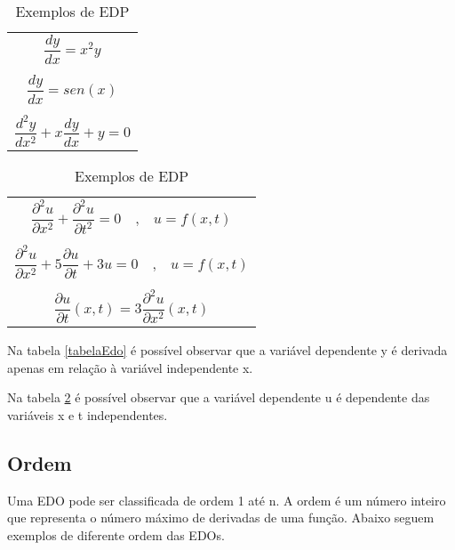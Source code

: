 \begin{table}[h!]
\parbox{.40\linewidth}{
\centering
\begin{tabular}{c}
\hline 
  $
\dfrac{dy}{dx} = x^2y
$
  \\  \\
  
$
\dfrac{dy}{dx} = sen(x)
$

 \\ \\
  
$
\dfrac{d^2y}{dx^2} + x \dfrac{dy}{dx} + y = 0
$  \\

\hline
\end{tabular}
\caption{Exemplos de EDO}
\label{tabelaEdo}
}
\hfill
\parbox{.50\linewidth}{
\centering
\begin{tabular}{c}
\toprule

$
\dfrac{\partial ^2u}{\partial x^2} + \dfrac{\partial ^2u}{\partial t^2} = 0  \quad \textrm{,} \quad  u = f(x,t)
$

 \\ \\
$
\dfrac{\partial^2u}{\partial x^2} + 5 \dfrac{\partial u}{\partial t} + 3u = 0 \quad \textrm{,} \quad   u = f(x,t)
$

 \\ \\ 
 $ \dfrac{\partial u}{\partial t}(x,t) = 3 \dfrac{\partial^2u}{\partial x^2}(x,t) $  
 \\

\bottomrule
\end{tabular}
\caption{Exemplos de EDP}
\label{tabelaEDP}
}
\end{table}

Na tabela \ref{tabelaEdo} é possível observar que a variável dependente y é derivada apenas em relação à variável independente x.

Na tabela \ref{tabelaEDP} é possível observar que a variável dependente u é dependente das variáveis x e t independentes.


\subsection[Ordem]{Ordem}

Uma EDO pode ser classificada de ordem 1 até n. A ordem é um número inteiro que representa o número máximo de derivadas de uma função. Abaixo seguem exemplos de diferente ordem das EDOs. 

